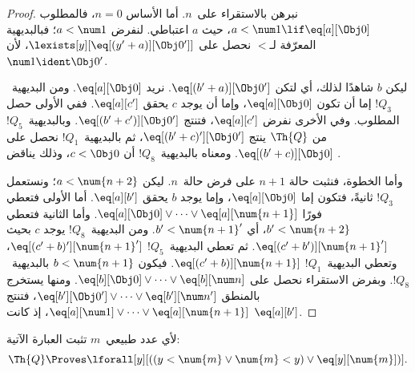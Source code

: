 \documentclass[../../../include/open-logic-section]{subfiles}
\begin{document}
\begin{proof}
نبرهن بالاستقراء على~$n$. أما الأساس $n=0$، فالمطلوب
$a<\num 1\lif\eq[a][\Obj 0]$، حيث $a$ اعتباطي.
لنفرض $a<\num 1$؛ فبالبديهية المعرّفة لـ$<$ نحصل على
$\lexists[y][\eq[(y'+a)][\Obj 0']]$، لأن
$\num 1\ident\Obj 0'$.

ليكن $b$ شاهدًا لذلك، أي لتكن
$\eq[(b'+a)][\Obj 0']$. نريد $\eq[a][\Obj 0]$.
ومن البديهية~$!Q_3$ إما أن تكون $\eq[a][\Obj 0]$،
وإما أن يوجد $c$ يحقق $\eq[a][c']$.
ففي الأولى حصل المطلوب. وفي الأخرى نفرض $\eq[a][c']$،
فتنتج $\eq[(b'+c')][\Obj 0']$.
وبالبديهية~$!Q_5$ من $\Th{Q}$ ينتج
$\eq[(b'+c)'][\Obj 0']$، ثم بالبديهية~$!Q_1$ نحصل على
$\eq[(b'+c)][\Obj 0]$. ومعناه بالبديهية~$!Q_8$ أن
$c<\Obj 0$، وذلك يناقض .

وأما الخطوة، فنثبت حالة $n+1$ على فرض حالة~$n$.
ليكن $a<\num{n+2}$؛ ونستعمل $!Q_3$ ثانيةً، فتكون إما
$\eq[a][\Obj 0]$، وإما يوجد $b$ يحقق $\eq[a][b']$.
أما الأولى فتعطي فورًا
$\eq[a][\Obj 0]\lor\dots\lor\eq[a][\num{n+1}]$.
وأما الثانية فتعطي $b'<\num{n+2}$، أي $b'<\num{n+1}'$.
ومن البديهية~$!Q_8$ يوجد $c$ بحيث
$\eq[(c'+b')][\num{n+1}']$. ثم تعطي البديهية~$!Q_5$
$\eq[(c'+b)'][\num{n+1}']$، وتعطي البديهية~$!Q_1$
$\eq[(c'+b)][\num{n+1}]$. فيكون $b<\num{n+1}$ بالبديهية~$!Q_8$.
وبفرض الاستقراء نحصل على
$\eq[b][\Obj 0]\lor\dots\lor\eq[b][\num n]$.
ومنها يستخرج بالمنطق
$\eq[b'][\Obj 0']\lor\dots\lor\eq[b'][\num n']$،
فتنتج $\eq[a][\num 1]\lor\dots\lor\eq[a][\num{n+1}]$،
إذ كانت $\eq[a][b']$.
\end{proof}

\begin{lem}
   لأي عدد طبيعي~$m$ تثبت العبارة الآتية:
  \[
  \Th{Q} \Proves
  \lforall[y][((y < \num{m} \lor \num{m} < y) \lor \eq[y][\num{m}])].
  \]
\end{lem}
\end{document}
